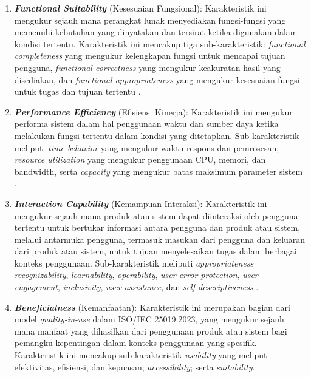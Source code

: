 \begin{enumerate}
  \item \textbf{\textit{Functional Suitability}} (Kesesuaian Fungsional): Karakteristik ini mengukur sejauh mana perangkat lunak menyediakan fungsi-fungsi yang memenuhi kebutuhan yang dinyatakan dan tersirat ketika digunakan dalam kondisi tertentu. Karakteristik ini mencakup tiga sub-karakteristik: \textit{functional completeness} yang mengukur kelengkapan fungsi untuk mencapai tujuan pengguna, \textit{functional correctness} yang mengukur keakuratan hasil yang disediakan, dan \textit{functional appropriateness} yang mengukur kesesuaian fungsi untuk tugas dan tujuan tertentu \citep{Abana_Sy_2022_ISO25010_Evaluation}.

  \item \textbf{\textit{Performance Efficiency}} (Efisiensi Kinerja): Karakteristik ini mengukur performa sistem dalam hal penggunaan waktu dan sumber daya ketika melakukan fungsi tertentu dalam kondisi yang ditetapkan. Sub-karakteristik meliputi \textit{time behavior} yang mengukur waktu respons dan pemrosesan, \textit{resource utilization} yang mengukur penggunaan CPU, memori, dan bandwidth, serta \textit{capacity} yang mengukur batas maksimum parameter sistem \citep{Kurniasari_Rochimah_2025_PerformanceEfficiency}.

  \item \textbf{\textit{Interaction Capability}} (Kemampuan Interaksi): Karakteristik ini mengukur sejauh mana produk atau sistem dapat diinteraksi oleh pengguna tertentu untuk bertukar informasi antara pengguna dan produk atau sistem, melalui antarmuka pengguna, termasuk masukan dari pengguna dan keluaran dari produk atau sistem, untuk tujuan menyelesaikan tugas dalam berbagai konteks penggunaan. Sub-karakteristik meliputi \textit{appropriateness recognizability}, \textit{learnability}, \textit{operability}, \textit{user error protection}, \textit{user engagement}, \textit{inclusivity}, \textit{user assistance}, dan \textit{self-descriptiveness} \citep{Cayola_Macias_2018_UsabilityMethods}.

  \item \textbf{\textit{Beneficialness}} (Kemanfaatan): Karakteristik ini merupakan bagian dari model \textit{quality-in-use} dalam ISO/IEC 25019:2023, yang mengukur sejauh mana manfaat yang dihasilkan dari penggunaan produk atau sistem bagi pemangku kepentingan dalam konteks penggunaan yang spesifik. Karakteristik ini mencakup sub-karakteristik \textit{usability} yang meliputi efektivitas, efisiensi, dan kepuasan; \textit{accessibility}; serta \textit{suitability}.
\end{enumerate}

